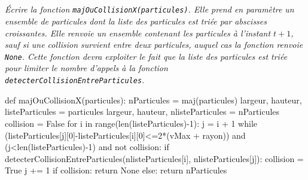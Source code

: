 \documentclass[10pt,fleqn]{article} %
\begin{document}
\subparagraph{}
\textit{Écrire la fonction \texttt{majOuCollisionX(particules)}. Elle prend en paramètre un ensemble de
particules dont la liste des particules est triée par abscisses croissantes. Elle renvoie un ensemble
contenant les particules à l'instant $t+1$, sauf si une collision survient entre deux particules, auquel
cas la fonction renvoie \texttt{None}. Cette fonction devra exploiter le fait que la liste des particules est
triée pour limiter le nombre d'appels à la fonction \texttt{detecterCollisionEntreParticules}.}
\ifprof
\begin{corrige}
\begin{python}
def majOuCollisionX(particules):
    nParticules = maj(particules)
    largeur, hauteur, listeParticules = particules
    largeur, hauteur, nlisteParticules = nParticules
    collision = False
    for i in range(len(listeParticules)-1):
        j = i + 1
        while (listeParticules[j][0]-listeParticules[i][0]<=2*(vMax + rayon)) 
         and (j<len(listeParticules)-1) and not collision:   
            if detecterCollisionEntreParticules(nlisteParticules[i], nlisteParticules[j]):
                collision = True
            j += 1
    if collision:
        return None
    else:
        return nParticules 
\end{python}
\end{corrige}
\else
\fi
\end{document}
